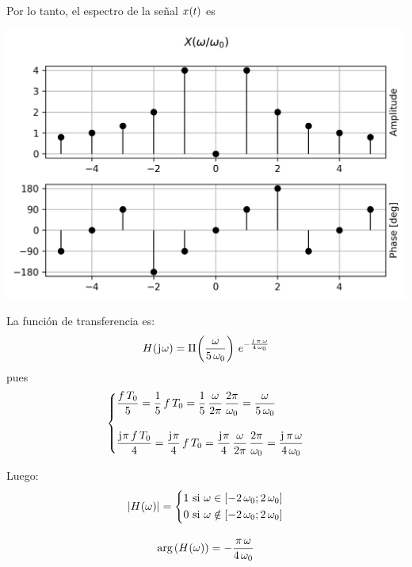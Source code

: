 \begin{mdframed}[style=ExampleFrame]
    Por lo tanto, el espectro de la señal $\fx[x]{t}$ es
    \begin{center}
        \includegraphics[width=\linewidth]{./images/ej_siemtria_hermitiana_x.png}
    \end{center}

    La función de transferencia es:
    \[
        \fx[H]{\iu \omega} = \pulse{\omega}{5 \, \omega_0} \, e^{-\frac{\iu \, \pi \, \omega}{4 \, \omega_0}}
    \]
    pues
    \[
        \left\{
        \begin{aligned}
            & \frac{f \, T_0}{5}
            = \frac{1}{5} \, f \, T_0
            = \frac{1}{5} \, \frac{\omega}{2 \pi} \, \frac{2 \pi}{\omega_0}
            = \frac{\omega}{5 \, \omega_0}
            \\[1em]
            & \frac{\iu \pi \, f \, T_0}{4}
            = \frac{\iu \pi}{4} \, f \, T_0
            = \frac{\iu \pi}{4} \, \frac{\omega}{2 \pi} \, \frac{2 \pi}{\omega_0}
            = \frac{\iu \, \pi \, \omega}{4 \, \omega_0}
        \end{aligned}
        \right.
    \]

    Luego:
    \begin{gather*}
        \norm{\fx[H]{\omega}} =
        \left\{
        \begin{aligned}
            & 1 \text{ si } \omega \in [-2 \, \omega_0 ; 2 \, \omega_0]
            \\
            & 0 \text{ si } \omega \notin [-2 \, \omega_0 ; 2 \, \omega_0]
        \end{aligned}
        \right.
        \\[1em]
        \fx[\arg]{\fx[H]{\omega}} =
        - \frac{\pi \, \omega}{4 \, \omega_0}
    \end{gather*}


\end{mdframed}
